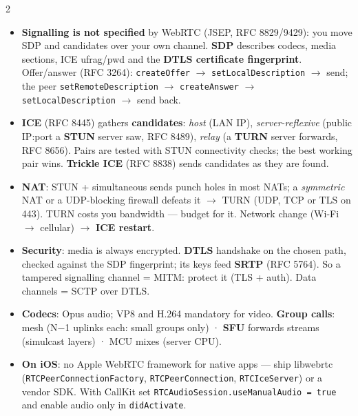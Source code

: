 \documentclass[8pt]{extarticle}
\newcommand\ct[1]{\texttt{#1}}
\newcommand\hd[1]{\par\vspace{3pt}\noindent{\bfseries\color{sheetBlue}#1}\par\vspace{1pt}}
\begin{document}
\begin{multicols}{2}
\footnotesize{}\raggedright

\hd{WebRTC}
\begin{itemize}
  \item \textbf{Signalling is not specified} by WebRTC (JSEP, RFC 8829/9429): you move SDP and
        candidates over your own channel. \textbf{SDP} describes codecs, media sections, ICE ufrag/pwd
        and the \textbf{DTLS certificate fingerprint}. Offer/answer (RFC 3264)\unverified:
        \ct{createOffer} $\to$ \ct{setLocalDescription} $\to$ send; the peer
        \ct{setRemoteDescription} $\to$ \ct{createAnswer} $\to$ \ct{setLocalDescription} $\to$ send back.
  \item \textbf{ICE} (RFC 8445) gathers \textbf{candidates}: \emph{host} (LAN IP), \emph{server-reflexive}
        (public IP:port a \textbf{STUN} server saw, RFC 8489), \emph{relay} (a \textbf{TURN} server
        forwards, RFC 8656). Pairs are tested with STUN connectivity checks; the best working pair
        wins. \textbf{Trickle ICE} (RFC 8838)\unverified{} sends candidates as they are found.
  \item \textbf{NAT}: STUN + simultaneous sends punch holes in most NATs; a \emph{symmetric} NAT or a
        UDP-blocking firewall defeats it $\to$ TURN (UDP, TCP or TLS on 443). TURN costs you
        bandwidth — budget for it. Network change (Wi-Fi $\to$ cellular) $\to$ \textbf{ICE restart}.
  \item \textbf{Security}: media is always encrypted. \textbf{DTLS} handshake on the chosen path,
        checked against the SDP fingerprint; its keys feed \textbf{SRTP} (RFC 5764)\unverified. So a
        tampered signalling channel = MITM: protect it (TLS + auth). Data channels = SCTP over DTLS.
  \item \textbf{Codecs}: Opus audio; VP8 and H.264 mandatory for video. \textbf{Group calls}: mesh
        (N$-$1 uplinks each: small groups only) · \textbf{SFU} forwards streams (simulcast layers) · MCU mixes
        (server CPU).
  \item \textbf{On iOS}: no Apple WebRTC framework for native apps — ship libwebrtc
        (\ct{RTCPeerConnectionFactory}, \ct{RTCPeerConnection}, \ct{RTCIceServer}) or a vendor SDK.
        With CallKit set \ct{RTCAudioSession.useManualAudio = true} and enable audio only in
        \ct{didActivate}.
\end{itemize}


\end{multicols}
\end{document}

